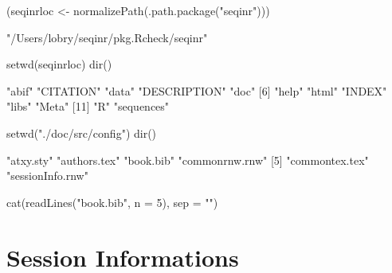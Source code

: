 \documentclass{article}
\begin{document}
\begin{Schunk}
\begin{Sinput}
 (seqinrloc <- normalizePath(.path.package("seqinr")))
\end{Sinput}
\begin{Soutput}
[1] "/Users/lobry/seqinr/pkg.Rcheck/seqinr"
\end{Soutput}
\begin{Sinput}
 setwd(seqinrloc)
 dir()
\end{Sinput}
\begin{Soutput}
 [1] "abif"        "CITATION"    "data"        "DESCRIPTION" "doc"        
 [6] "help"        "html"        "INDEX"       "libs"        "Meta"       
[11] "R"           "sequences"  
\end{Soutput}
\begin{Sinput}
 setwd("./doc/src/config")
 dir()
\end{Sinput}
\begin{Soutput}
[1] "atxy.sty"        "authors.tex"     "book.bib"        "commonrnw.rnw"  
[5] "commontex.tex"   "sessionInfo.rnw"
\end{Soutput}
\begin{Sinput}
 cat(readLines("book.bib", n = 5), sep = "\n")
\end{Sinput}
\begin{Soutput}
@incollection{seqinr,
    author = {Charif, D. and Lobry, J.R.},
    title = {Seqin{R} 1.0-2: a contributed package to the {R} project for statistical computing devoted to biological sequences retrieval and analysis.},
    booktitle = {Structural approaches to sequence evolution: Molecules, networks, populations},
    year = {2007},
\end{Soutput}
\end{Schunk}

%
%


\section*{Session Informations}
\end{document}
